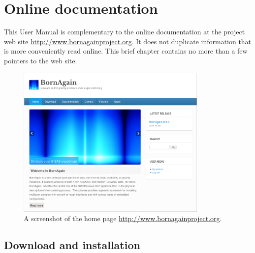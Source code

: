 

\newpage
\chapter{Online documentation}
  \label{sec:online}

This User Manual is complementary to the online documentation
at the project web site \url{http://www.bornagainproject.org}.
It does not duplicate information that is more conveniently
read online.
This brief chapter contains no more than a few pointers to the web site.

\begin{figure}[ht]
\begin{center}
\includegraphics[width=0.83\textwidth]{fig/screenshot/website.png}
\end{center}
\caption{A screenshot of the home page
         \url{http://www.bornagainproject.org}.}
\label{fig:website}
\end{figure}


\section{Download and installation}

